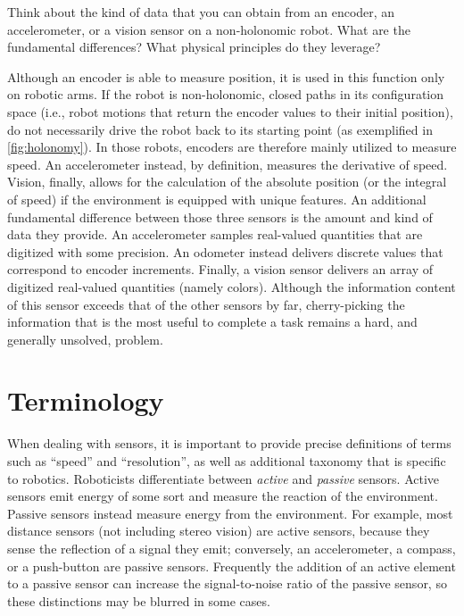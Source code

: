 \begin{mdframed}
Think about the kind of data that you can obtain from an encoder, an accelerometer, or a vision sensor on a non-holonomic robot. What are the fundamental differences? What physical principles do they leverage?
\end{mdframed}

Although an encoder is able to measure position, it is used in this function only on robotic arms. If the robot is non-holonomic, closed paths in its configuration space (i.e., robot motions that return the encoder values to their initial position), do not necessarily drive the robot back to its starting point (as exemplified in \cref{fig:holonomy}).
In those robots, encoders are therefore mainly utilized to measure speed. An accelerometer instead, by definition, measures the derivative of speed. Vision, finally, allows for the calculation of the absolute position (or the integral of speed) if the environment is equipped with unique features. An additional fundamental difference between those three sensors is the amount and kind of data they provide. An accelerometer samples real-valued quantities that are digitized with some precision. An odometer instead delivers discrete values that correspond to encoder increments. Finally, a vision sensor delivers an array of digitized real-valued quantities (namely colors). Although the information content of this sensor exceeds that of the other sensors by far, cherry-picking the information that is the most useful to complete a task remains a hard, and generally unsolved, problem.

\section{Terminology}\label{sec:sensors:terminology}

When dealing with sensors, it is important to provide precise definitions of terms such as ``speed'' and ``resolution'', as well as additional taxonomy that is specific to robotics.
%
Roboticists differentiate between \textsl{active} and \textsl{passive} sensors. Active sensors  emit energy of some sort and measure the reaction of the environment. Passive sensors  instead measure energy from the environment. For example, most distance sensors (not including stereo vision) are active sensors, because they sense the reflection of a signal they emit; conversely, an accelerometer, a compass, or a push-button are passive sensors. Frequently the addition of an active element to a passive sensor can increase the signal-to-noise ratio of the passive sensor, so these distinctions may be blurred in some cases.

